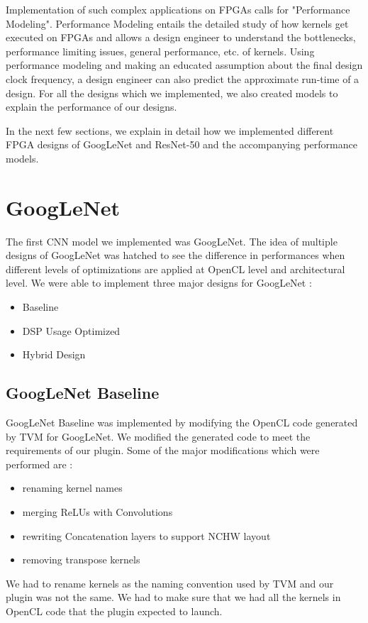 Implementation of such complex applications on FPGAs calls for "Performance Modeling". Performance Modeling entails the detailed study of how kernels get executed on FPGAs and allows a design engineer to understand the bottlenecks, performance limiting issues, general performance, etc. of kernels. Using performance modeling and making an educated assumption about the final design clock frequency, a design engineer can also predict the approximate run-time of a design.
For all the designs which we implemented, we also created models to explain the performance of our designs.    

In the next few sections, we explain in detail how we implemented different FPGA designs of GoogLeNet and ResNet-50 and the accompanying performance models.



\section{GoogLeNet}

The first CNN model we implemented was GoogLeNet. The idea of multiple designs of GoogLeNet was hatched to see the difference in performances when different levels of optimizations are applied at OpenCL level and architectural level. 
We were able to implement three major designs for GoogLeNet :
\begin{itemize}
  \item Baseline
  \item DSP Usage Optimized
  \item Hybrid Design
\end{itemize}  

\subsection{GoogLeNet Baseline}

GoogLeNet Baseline was implemented by modifying the OpenCL code generated by TVM for GoogLeNet. We modified the generated code to meet the requirements of our plugin. Some of the major modifications which were performed are :
\begin{itemize}
  \item renaming kernel names
  \item merging ReLUs with Convolutions
  \item rewriting Concatenation layers to support NCHW layout
  \item removing transpose kernels
\end{itemize}  
We had to rename kernels as the naming convention used by TVM and our plugin was not the same. We  had to make sure that we had all the kernels in OpenCL code that the plugin expected to launch.

